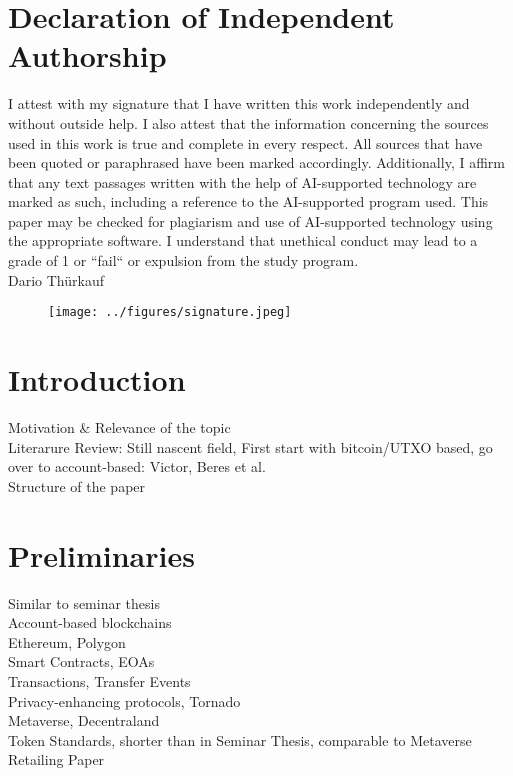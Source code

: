 \documentclass[12pt,a4paper,titlepage,oneside,english]{article}
\begin{document}
\section*{Declaration of Independent Authorship}
I attest with my signature that I have written this work independently and without outside help. I also attest that the information concerning the sources used in this work is true and complete in every respect. All sources that have been quoted or paraphrased have been marked accordingly. 
Additionally, I affirm that any text passages written with the help of AI-supported technology are marked as such, including a reference to the AI-supported program used. This paper may be checked for plagiarism and use of AI-supported technology using the appropriate software. I understand that unethical conduct may lead to a grade of 1 or ``fail`` or expulsion from the study program.\\

Dario Thürkauf

\begin{figure}[h!]
	\centering
	\hspace{-10cm}
	\texttt{[image: ../figures/signature.jpeg]}
\end{figure}

\newpage
\onehalfspacing
{}



\section{Introduction}
Motivation \& Relevance of the topic \\
Literarure Review: Still nascent field, First start with bitcoin/UTXO based, go over to account-based: Victor, Beres et al. \\
Structure of the paper  \\



\section{Preliminaries}

Similar to seminar thesis\\
Account-based blockchains\\
Ethereum, Polygon\\
Smart Contracts, EOAs\\
Transactions, Transfer Events \\
Privacy-enhancing protocols, Tornado \\
Metaverse, Decentraland \\
Token Standards, shorter than in Seminar Thesis, comparable to Metaverse Retailing Paper \\
\end{document}
